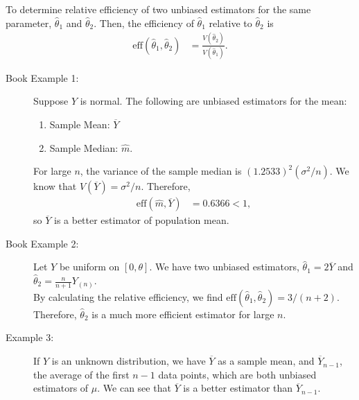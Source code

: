 \documentclass[10pt]{extarticle}
\begin{document}
  To determine relative efficiency of two unbiased estimators for the same parameter, $\hat{\theta}_1$ and $\hat{\theta}_2$. Then, the efficiency of $\hat{\theta}_1$ relative to $\hat{\theta}_2$ is
  \begin{align*}
    \text{eff}(\hat{\theta}_1,\hat{\theta}_2) &= \frac{V(\hat{\theta}_2)}{V(\hat{\theta}_1)}.
  \end{align*}
  \begin{description}
    \item[Book Example 1:] Suppose $Y$ is normal. The following are unbiased estimators for the mean:
      \begin{enumerate}[(1)]
        \item Sample Mean: $\overline{Y}$
        \item Sample Median: $\hat{m}$.
      \end{enumerate}
      For large $n$, the variance of the sample median is $(1.2533)^2(\sigma^2/n)$. We know that $V(\overline{Y}) = \sigma^2/n$. Therefore,
      \begin{align*}
        \text{eff}(\hat{m},\overline{Y}) &= 0.6366 < 1,
      \end{align*}
      so $\overline{Y}$ is a better estimator of population mean.
    \item[Book Example 2:] Let $Y$ be uniform on $[0,\theta]$. We have two unbiased estimators, $\hat{\theta}_1 = 2\overline{Y}$ and $\hat{\theta}_2 = \frac{n}{n+1}Y_{(n)}$.\\

      By calculating the relative efficiency, we find $\text{eff}(\hat{\theta}_1,\hat{\theta}_2) = 3/(n+2)$. Therefore, $\hat{\theta}_2$ is a much more efficient estimator for large $n$.
    \item[Example 3:] If $Y$ is an unknown distribution, we have $\overline{Y}$ as a sample mean, and $\overline{Y}_{n-1}$, the average of the first $n-1$ data points, which are both unbiased estimators of $\mu$. We can see that $\overline{Y}$ is a better estimator than $\overline{Y}_{n-1}$.
  \end{description}
\end{document}
